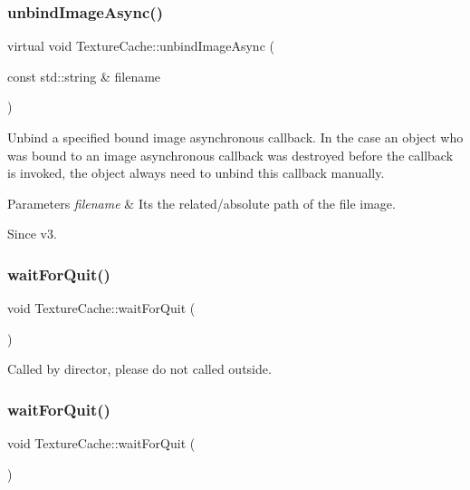 \subsubsection{\texorpdfstring{unbind\+Image\+Async()}{unbindImageAsync()}\hspace{0.1cm}{\footnotesize\ttfamily [2/2]}}
{\footnotesize\ttfamily virtual void Texture\+Cache\+::unbind\+Image\+Async (\begin{DoxyParamCaption}\item[{const std\+::string \&}]{filename }\end{DoxyParamCaption})\hspace{0.3cm}{\ttfamily [virtual]}}

Unbind a specified bound image asynchronous callback. In the case an object who was bound to an image asynchronous callback was destroyed before the callback is invoked, the object always need to unbind this callback manually. 
\begin{DoxyParams}{Parameters}
{\em filename} & It\textquotesingle{}s the related/absolute path of the file image. \\
\hline
\end{DoxyParams}
\begin{DoxySince}{Since}
v3. 
\end{DoxySince}
\mbox{\label{classTextureCache_ae51af522306e9449d772c3996509a509}} 
\subsubsection{\texorpdfstring{wait\+For\+Quit()}{waitForQuit()}\hspace{0.1cm}{\footnotesize\ttfamily [1/2]}}
{\footnotesize\ttfamily void Texture\+Cache\+::wait\+For\+Quit (\begin{DoxyParamCaption}{ }\end{DoxyParamCaption})}

Called by director, please do not called outside. \mbox{\label{classTextureCache_ae51af522306e9449d772c3996509a509}} 
\subsubsection{\texorpdfstring{wait\+For\+Quit()}{waitForQuit()}\hspace{0.1cm}{\footnotesize\ttfamily [2/2]}}
{\footnotesize\ttfamily void Texture\+Cache\+::wait\+For\+Quit (\begin{DoxyParamCaption}{ }\end{DoxyParamCaption})}


